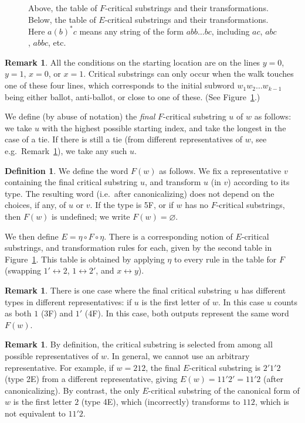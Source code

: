 \documentclass[10pt]{amsart}
\theoremstyle{definition}
\newtheorem{defi}[theorem]{Definition}
\newtheorem{rema}[theorem]{Remark}
\providecommand{\ie}{i.e.\ }
\providecommand{\eg}{e.g.\ }
\providecommand{\etc}{etc.\ }
\begin{document}
\begin{figure}[htb]
\caption{\label{fig:criticals} Above, the table of $F$-critical substrings and their transformations. Below, the table of $E$-critical substrings and their transformations. Here $a(b)^*c$ means any string of the form $abb \dots bc$, including $ac$, $abc$, $abbc$, \etc}
\end{figure}


\begin{rema} All the conditions on the starting location are on the lines $y=0$, $y=1$, $x=0$, or $x=1$. Critical substrings can only occur when the walk touches one of these four lines, which corresponds to the initial subword $w_1w_2 \dots w_{k-1}$ being either ballot, anti-ballot, or close to one of these. (See Figure~\ref{fig:criticals}.)
\end{rema}

We define (by abuse of notation) the \emph{final} $F$-critical substring $u$ of $w$ as follows: we take $u$ with the highest possible starting index, and take the longest in the case of a tie. If there is still a tie (from different representatives of $w$, see \eg Remark~\ref{rmk:tie-for-final}), we take any such $u$. 

\begin{defi}\label{def:F}
We define the word $F(w)$ as follows. We fix a representative $v$ containing the final critical substring $u$, and transform $u$ (in $v$) according to its type. The resulting word (\ie after canonicalizing) does not depend on the choices, if any, of $u$ or $v$. If the type is 5F, or if $w$ has no $F$-critical substrings, then $F(w)$ is undefined; we write $F(w) = \varnothing$.

We then define $E = \eta \circ F \circ \eta$. There is a corresponding notion of $E$-critical substrings, and transformation rules for each, given by the second table in Figure~\ref{fig:criticals}. This table is obtained by applying $\eta$ to every rule in the table
for $F$ (swapping $1' \leftrightarrow 2$, $1 \leftrightarrow 2'$, and $x \leftrightarrow y$).
\end{defi}

\begin{rema} \label{rmk:tie-for-final}
There is one case where the final critical substring $u$ has different types in different representatives: if $u$ is the first letter of $w$. In this case $u$ counts as both $1$ (3F) and $1'$ (4F). In this case, both outputs represent the same word $F(w)$.
\end{rema}

\begin{rema}
By definition, the critical substring is selected from among all possible representatives of $w$. In general, we cannot use an arbitrary representative. For example, if $w = 212$, the final $E$-critical substring is $2'1'2$ (type 2E) from a different representative, giving $E(w) = 11'2' = 11'2$ (after canonicalizing). By contrast, the only $E$-critical substring of the canonical form of $w$ is the first letter $2$ (type 4E), which (incorrectly) transforms to $112$, which is not equivalent to $11'2$.
\end{rema}
\end{document}
